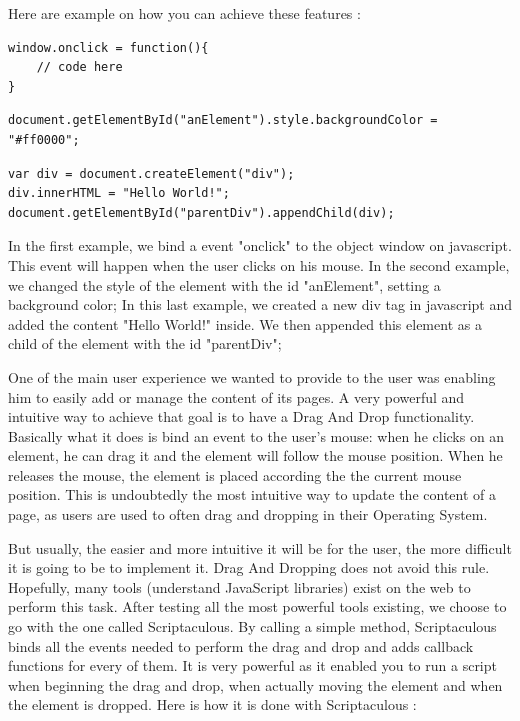 \clearpage
Here are example on how you can achieve these features :

\lstset{language=Javascript}
\begin{lstlisting}[label=javascript_event,caption=Binding an event in Javascript]
window.onclick = function(){
	// code here
}
\end{lstlisting}


\begin{lstlisting}[label=javascript_appearance,caption=Modifying the css of an element ]
document.getElementById("anElement").style.backgroundColor = "#ff0000";
\end{lstlisting}

\begin{lstlisting}[label=javascript_dom,caption=Handling the DOM]
var div = document.createElement("div");
div.innerHTML = "Hello World!";
document.getElementById("parentDiv").appendChild(div);
\end{lstlisting}

In the first example, we bind a event "onclick" to the object window on javascript. This event will happen when the user clicks on his mouse.
In the second example, we changed the style of the element with the id "anElement", setting a background color;
In this last example, we created a new div tag in javascript and added the content "Hello World!" inside. We then appended this element as a child of the element with the id "parentDiv";

One of the main user experience we wanted to provide to the user was enabling him to easily add or manage the content of its pages. A very powerful and intuitive way to achieve that goal is to have a Drag And Drop functionality. Basically what it does is bind an event to the user's mouse: when he clicks on an element, he can drag it and the element will follow the mouse position. When he releases the mouse, the element is placed according the the current mouse position. This is undoubtedly the most intuitive way to update the content of a page, as users are used to often drag and dropping in their Operating System. 

But usually, the easier and more intuitive it will be for the user, the more difficult it is going to be to implement it. Drag And Dropping does not avoid this rule. Hopefully, many tools (understand JavaScript libraries) exist on the web to perform this task. After testing all the most powerful tools existing, we choose to go with the one called Scriptaculous. By calling a simple method, Scriptaculous binds all the events needed to perform the drag and drop and adds callback functions for every of them. It is very powerful as it enabled you to run a script when beginning the drag and drop, when actually moving the element and when the element is dropped.
Here is how it is done with Scriptaculous :


